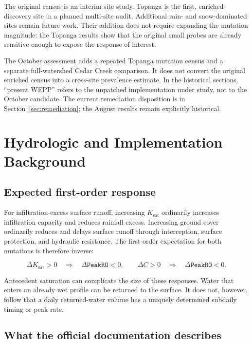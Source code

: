 \documentclass[11pt]{article}
\newcommand{\Ksat}{\ensuremath{K_{\mathrm{sat}}}}
\newcommand{\PeakRO}{\texttt{PeakRO}}
\begin{document}
The original census is an interim site study. Topanga is the first, enriched-discovery site
in a planned multi-site audit. Additional rain- and snow-dominated sites remain
future work. Their addition does not require expanding the mutation magnitude:
the Topanga results show that the original small probes are already sensitive
enough to expose the response of interest.

The October assessment adds a repeated Topanga mutation census and a separate
full-watershed Cedar Creek comparison. It does not convert the original
enriched census into a cross-site prevalence estimate. In the historical
sections, ``present WEPP'' refers to the unpatched implementation under study,
not to the October candidate. The current remediation disposition is in
Section~\ref{sec:remediation}; the August results remain explicitly historical.

\section{Hydrologic and Implementation Background}

\subsection{Expected first-order response}

For infiltration-excess surface runoff, increasing \Ksat{} ordinarily
increases infiltration capacity and reduces rainfall excess. Increasing ground
cover ordinarily reduces and delays surface runoff through interception,
surface protection, and hydraulic resistance. The first-order expectation for
both mutations is therefore inverse:

\begin{equation}
  \Delta \Ksat > 0 \quad \Rightarrow \quad \Delta \PeakRO < 0,
  \qquad
  \Delta C > 0 \quad \Rightarrow \quad \Delta \PeakRO < 0.
\end{equation}

Antecedent saturation can complicate the size of these responses. Water that
enters an already wet profile can be returned to the surface. It does not,
however, follow that a daily returned-water volume has a uniquely determined
subdaily timing or peak rate.

\subsection{What the official documentation describes}
\end{document}
